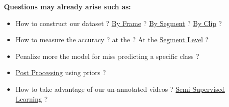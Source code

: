 \begin{frame}
    \textbf{Questions may already arise such as:}
    
    \vspace{0.5em}

    \begin{itemize}
        \item How to construct our dataset ? \underline{By Frame} ? \underline{By Segment} ? \underline{By Clip} ?
        \item How to measure the accuracy ? at the  ? At the \underline{Segment Level} ?
        \item Penalize more the model for miss predicting a specific class ?
        \item \underline{Post Processing} using priors ?
        \item How to take advantage of our un-annotated videos ? \underline{Semi Supervised Learning} ?
    \end{itemize}
\end{frame}


